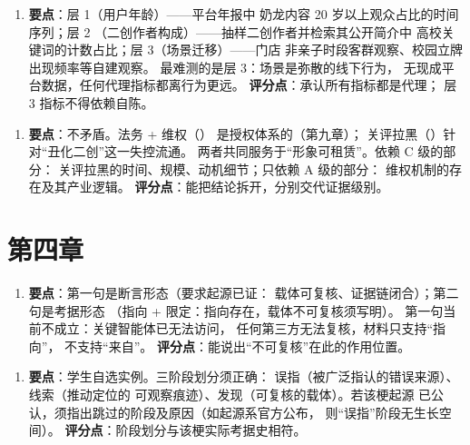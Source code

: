\begin{enumerate}[label=\textbf{2.},leftmargin=2.6em]
  \item \textbf{要点}：层 1（用户年龄）——平台年报中
        奶龙内容 20 岁以上观众占比的时间序列；层 2
        （二创作者构成）——抽样二创作者并检索其公开简介中
        高校关键词的计数占比；层 3（场景迁移）——门店
        非亲子时段客群观察、校园立牌出现频率等自建观察。
        最难测的是层 3：场景是弥散的线下行为，
        无现成平台数据，任何代理指标都离行为更远。
        \textbf{评分点}：承认所有指标都是代理；
        层 3 指标不得依赖自陈。
\end{enumerate}

\begin{enumerate}[label=\textbf{3.},leftmargin=2.6em]
  \item \textbf{要点}：不矛盾。法务 + 维权（）
        是授权体系的（第九章）；
        关评拉黑（）针对“丑化二创”这一失控流通。
        两者共同服务于“形象可租赁”。依赖 C 级的部分：
        关评拉黑的时间、规模、动机细节；只依赖 A 级的部分：
        维权机制的存在及其产业逻辑。
        \textbf{评分点}：能把结论拆开，分别交代证据级别。
\end{enumerate}

\section{第四章}\label{app:ans:04}

\begin{enumerate}[label=\textbf{1.},leftmargin=2.6em]
  \item \textbf{要点}：第一句是断言形态（要求起源已证：
        载体可复核、证据链闭合）；第二句是考据形态
        （指向 + 限定：指向存在，载体不可复核须写明）。
        第一句当前不成立：关键智能体已无法访问，
        任何第三方无法复核，材料只支持“指向”，
        不支持“来自”。
        \textbf{评分点}：能说出“不可复核”在此的作用位置。
\end{enumerate}

\begin{enumerate}[label=\textbf{2.},leftmargin=2.6em]
  \item \textbf{要点}：学生自选实例。三阶段划分须正确：
        误指（被广泛指认的错误来源）、线索（推动定位的
        可观察痕迹）、发现（可复核的载体）。若该梗起源
        已公认，须指出跳过的阶段及原因（如起源系官方公布，
        则“误指”阶段无生长空间）。
        \textbf{评分点}：阶段划分与该梗实际考据史相符。
\end{enumerate}

